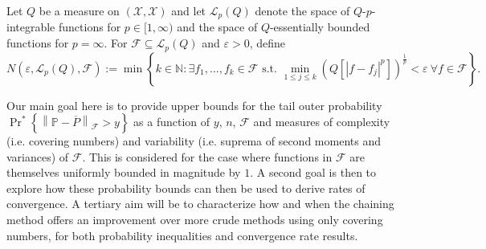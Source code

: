 \begin{definition}
\label{def--Lr-covering-number}
Let \(Q\) be a measure on \(\left( \mathcal{X}, \mathscr{X} \right)\) and let
\(\mathscr{L}_{p} (Q)\) denote the space of \(Q\)-\(p\)-integrable functions for
\(p \in [1, \infty)\) and the space of \(Q\)-essentially bounded functions for
\(p = \infty\).
For \(\mathcal{F} \subseteq \mathscr{L}_{p} (Q)\) and \(\varepsilon > 0\),
define
\begin{equation*}
  N \left( \varepsilon, \mathscr{L}_{p} (Q), \mathcal{F} \right) := \min \left\{
  k \in \mathbb{N} : \exists f_{1}, \dots, f_{k} \in \mathcal{F} \text{ s.t. }
  \min_{1 \leq j \leq k} \left( Q \left[ \left| f - f_{j} \right|^{p} \right]
  \right)^{\frac{1}{p}} < \varepsilon \ \forall f \in \mathcal{F} \right\}.
\end{equation*}
\end{definition}

Our main goal here is to provide upper bounds for the tail outer probability
\(\Pr^{\ast} \left\{ \left\| \mathbb{P} - \overline{P} \right\|_{\mathcal{F}} >
y \right\}\) as a function of \(y\), \(n\), \(\mathcal{F}\) and
measures of complexity (i.e. covering numbers) and variability (i.e. suprema of
second moments and variances) of \(\mathcal{F}\).
This is considered for the case where functions in \(\mathcal{F}\) are
themselves uniformly bounded in magnitude by \(1\).
A second goal is then to explore how these probability bounds can then be used
to derive rates of convergence.
A tertiary aim will be to characterize how and when the chaining method offers
an improvement over more crude methods using only covering
numbers, for both probability inequalities and convergence rate results.

